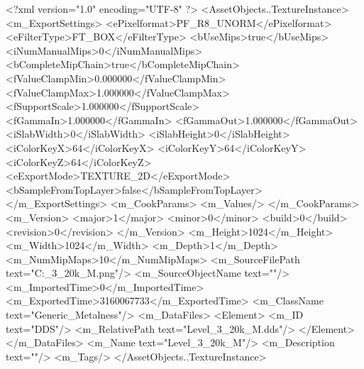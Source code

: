 <?xml version="1.0" encoding="UTF-8" ?>
<AssetObjects..TextureInstance>
	<m_ExportSettings>
		<ePixelformat>PF_R8_UNORM</ePixelformat>
		<eFilterType>FT_BOX</eFilterType>
		<bUseMips>true</bUseMips>
		<iNumManualMips>0</iNumManualMips>
		<bCompleteMipChain>true</bCompleteMipChain>
		<fValueClampMin>0.000000</fValueClampMin>
		<fValueClampMax>1.000000</fValueClampMax>
		<fSupportScale>1.000000</fSupportScale>
		<fGammaIn>1.000000</fGammaIn>
		<fGammaOut>1.000000</fGammaOut>
		<iSlabWidth>0</iSlabWidth>
		<iSlabHeight>0</iSlabHeight>
		<iColorKeyX>64</iColorKeyX>
		<iColorKeyY>64</iColorKeyY>
		<iColorKeyZ>64</iColorKeyZ>
		<eExportMode>TEXTURE_2D</eExportMode>
		<bSampleFromTopLayer>false</bSampleFromTopLayer>
	</m_ExportSettings>
	<m_CookParams>
		<m_Values/>
	</m_CookParams>
	<m_Version>
		<major>1</major>
		<minor>0</minor>
		<build>0</build>
		<revision>0</revision>
	</m_Version>
	<m_Height>1024</m_Height>
	<m_Width>1024</m_Width>
	<m_Depth>1</m_Depth>
	<m_NumMipMaps>10</m_NumMipMaps>
	<m_SourceFilePath text="C:\Users\Shadow\Desktop\Prototypes\Level_3_20k_M.png"/>
	<m_SourceObjectName text=""/>
	<m_ImportedTime>0</m_ImportedTime>
	<m_ExportedTime>3160067733</m_ExportedTime>
	<m_ClassName text="Generic_Metalness"/>
	<m_DataFiles>
		<Element>
			<m_ID text="DDS"/>
			<m_RelativePath text="Level_3_20k_M.dds"/>
		</Element>
	</m_DataFiles>
	<m_Name text="Level_3_20k_M"/>
	<m_Description text=""/>
	<m_Tags/>
</AssetObjects..TextureInstance>

